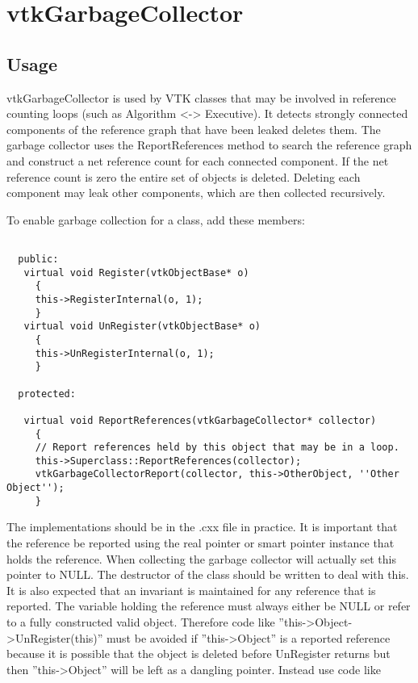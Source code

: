 \section{vtkGarbageCollector}

\subsection{Usage}

 vtkGarbageCollector is used by VTK classes that may be involved in
 reference counting loops (such as Algorithm <-> Executive).  It
 detects strongly connected components of the reference graph that
 have been leaked deletes them.  The garbage collector uses the
 ReportReferences method to search the reference graph and construct
 a net reference count for each connected component.  If the net
 reference count is zero the entire set of objects is deleted.
 Deleting each component may leak other components, which are then
 collected recursively.

 To enable garbage collection for a class, add these members:

 \begin{verbatim}

  public:
   virtual void Register(vtkObjectBase* o)
     {
     this->RegisterInternal(o, 1);
     }
   virtual void UnRegister(vtkObjectBase* o)
     {
     this->UnRegisterInternal(o, 1);
     }

  protected:

   virtual void ReportReferences(vtkGarbageCollector* collector)
     {
     // Report references held by this object that may be in a loop.
     this->Superclass::ReportReferences(collector);
     vtkGarbageCollectorReport(collector, this->OtherObject, ''Other Object'');
     }
 \end{verbatim}

 The implementations should be in the .cxx file in practice.
 It is important that the reference be reported using the real
 pointer or smart pointer instance that holds the reference.  When
 collecting the garbage collector will actually set this pointer to
 NULL.  The destructor of the class should be written to deal with
 this.  It is also expected that an invariant is maintained for any
 reference that is reported.  The variable holding the reference
 must always either be NULL or refer to a fully constructed valid
 object.  Therefore code like ''this->Object->UnRegister(this)'' must
 be avoided if ''this->Object'' is a reported reference because it
 is possible that the object is deleted before UnRegister returns
 but then ''this->Object'' will be left as a dangling pointer.  Instead
 use code like

